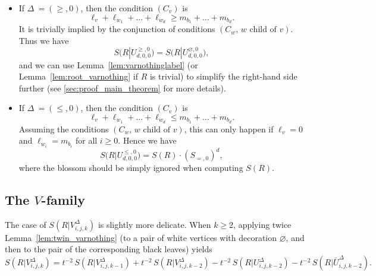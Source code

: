 \documentclass[12pt]{amsart}
\theoremstyle{plain}
\theoremstyle{remark}
\begin{document}
\begin{itemize}
\item If $\Delta\ =(\geq,0)$, then the condition $(C_v)$ is
\[\ell_v+ \ell_{w_1}+ \dots+ \ell_{w_d} \ge  m_{b_1}+ \dots+ m_{b_d}.\]
It is trivially implied by the conjunction of conditions $(C_w, \, w\text{ child of }v)$.
Thus we have
\begin{equation}
\label{eq:U1}
S\big(R|U^{\geq,0}_{d,0,0}\big)=S\big(R|U^{\varnothing,0}_{d,0,0}\big),
\end{equation}
and we can use Lemma~\ref{lem:varnothinglabel} (or Lemma~\ref{lem:root_varnothing} if $R$ is trivial) to simplify the right-hand side further (see \cref{sec:proof_main_theorem} for more details).
\item If $\Delta\ =(\leq,0)$, then the condition $(C_v)$ is
\[\ell_v+ \ell_{w_1}+ \dots+ \ell_{w_d} \le  m_{b_1}+ \dots+ m_{b_d}.\]
Assuming the conditions $(C_w, \, w\text{ child of }v)$, this can only happen
if $\ell_v=0$ and $\ell_{w_i}=m_{b_i}$ for all $i \ge 0$.
Hence we have
\begin{equation}
\label{eq:U2}
S\big(R|U^{\leq,0}_{d,0,0}\big)=S(R) \cdot (S_{=,0})^d,
\end{equation}
 where the blossom should be simply ignored when computing $S(R)$.
\end{itemize}


\subsection{The $V$-family}
The case of $S(R|V^{\Delta}_{i,j,k})$ is slightly more delicate.
When $k \ge 2$, applying twice Lemma~\ref{lem:twin_varnothing} (to a pair of white vertices with decoration $\varnothing$, and then to the pair of the corresponding black leaves) yields
\begin{equation}
\label{eq:V1}
S(R|V^{\Delta}_{i,j,k}) = t^{-2} \, S(R|V^{\Delta}_{i,j,k-1}) + t^{-2} \, S(R|V^{\Delta}_{i,j,k-2}) - t^{-2} \, S(R|U^{\Delta}_{i,j,k-2}) - t^{-2} \, S(R|\overline{U}^{\Delta}_{i,j,k-2}).
\end{equation}
\end{document}
